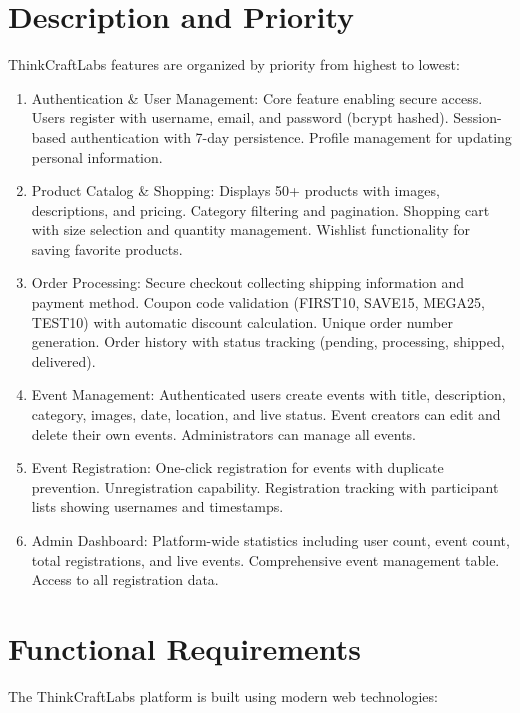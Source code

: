 \documentclass{scrreprt}
\begin{document}
\section{Description and Priority}
ThinkCraftLabs features are organized by priority from highest to lowest:

\begin{enumerate}
\item Authentication \& User Management: Core feature enabling secure access. Users register with username, email, and password (bcrypt hashed). Session-based authentication with 7-day persistence. Profile management for updating personal information.

\item Product Catalog \& Shopping: Displays 50+ products with images, descriptions, and pricing. Category filtering and pagination. Shopping cart with size selection and quantity management. Wishlist functionality for saving favorite products.

\item Order Processing: Secure checkout collecting shipping information and payment method. Coupon code validation (FIRST10, SAVE15, MEGA25, TEST10) with automatic discount calculation. Unique order number generation. Order history with status tracking (pending, processing, shipped, delivered).

\item Event Management: Authenticated users create events with title, description, category, images, date, location, and live status. Event creators can edit and delete their own events. Administrators can manage all events.

\item Event Registration: One-click registration for events with duplicate prevention. Unregistration capability. Registration tracking with participant lists showing usernames and timestamps.

\item Admin Dashboard: Platform-wide statistics including user count, event count, total registrations, and live events. Comprehensive event management table. Access to all registration data.
\end{enumerate}

\section{Functional Requirements}
The ThinkCraftLabs platform is built using modern web technologies:
\end{document}
